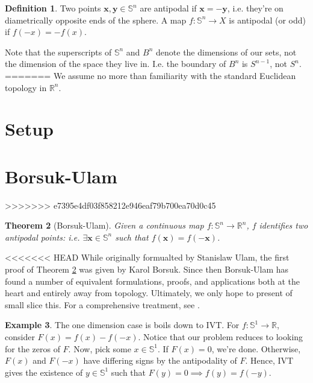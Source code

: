 \documentclass[12pt]{amsart}
\newtheorem{thm}{Theorem}[section]
\theoremstyle{definition}
\newtheorem{dfn}[thm]{Definition}
\newtheorem{ex}[thm]{Example}
\begin{document}
    \begin{dfn}
        Two points $\mathbf x, \mathbf y \in \mathbb S^n$ are antipodal if $\mathbf x = -\mathbf y$, i.e. they're on diametrically opposite ends of the sphere. A map $f: \mathbb S^n \to X$ is antipodal (or odd) if $f(-x) = -f(x)$.
    \end{dfn}

    Note that the superscripts of $\mathbb S^n$ and $B^n$ denote the dimensions of our sets, not the dimension of the space they live in. I.e. the boundary of $B^n$ is $S^{n-1}$, not $S^n$.
=======
We assume no more than familiarity with the standard Euclidean
topology in $\mathbb R^n$.

\section{Setup}

\newpage

\section{Borsuk-Ulam}
>>>>>>> e7395e4df03f858212e946eaf79b700ea70d0c45

\begin{thm}[Borsuk-Ulam]
  \label{main}
  Given a continuous map $f: \mathbb S^n \to \mathbb R^n$, $f$
  identifies two antipodal points: i.e.
  $\exists \mathbf x \in \mathbb S^n$ such that
  $f(\mathbf x) = f(-\mathbf x)$.
\end{thm}

<<<<<<< HEAD
    While originally formualted by Stanislaw Ulam, the first proof of Theorem \ref{main} was given by Karol Borsuk. Since then Borsuk-Ulam has found a number of equivalent formulations, proofs, and applications both at the heart and entirely away from topology. Ultimately, we only hope to present of small slice this. For a comprehensive treatment, see \cite{stein}.

    \begin{ex}
        The one dimension case is boils down to IVT. For $f: \mathbb S^1 \to \mathbb R$, consider $F(x) = f(x) - f(-x)$. Notice that our problem reduces to looking for the zeros of $F$. Now, pick some $x \in \mathbb S^1$. If $F(x) = 0$, we're done. Otherwise, $F(x)$ and $F(-x)$ have differing signs by the antipodality of $F$. Hence, IVT gives the existence of $y \in \mathbb S^1$ such that $F(y) = 0 \implies f(y) = f(-y)$. 
    \end{ex}
\end{document}
